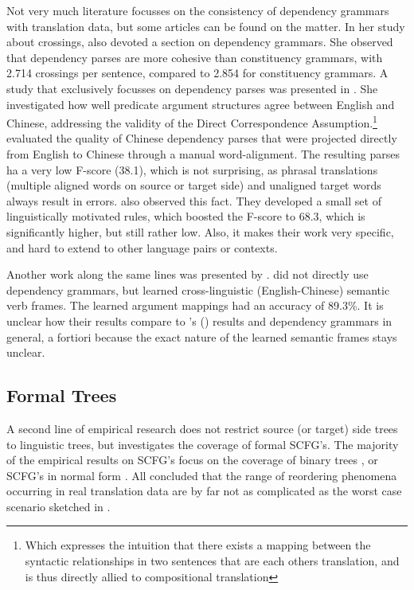 \documentclass{report}
\theoremstyle{break}
\def\citepos#1{\citeauthor{#1}'s (\citeyear{#1})}
\begin{document}
Not very much literature focusses on the consistency of dependency grammars with translation data, but some articles can be found on the matter. In her study about crossings, \citeauthor{fox2002phrasal} also devoted a section on dependency grammars. She observed that dependency parses are more cohesive than constituency grammars, with
2.714 crossings per sentence, compared to 2.854 for constituency grammars. A study that exclusively focusses on dependency parses was presented in \cite{hwa2002evaluating}. She investigated how well predicate argument structures agree between English and Chinese, addressing the validity of the Direct Correspondence Assumption.\footnote{Which expresses the intuition that there exists a mapping between the syntactic relationships in two sentences that are each others translation, and is thus directly allied to compositional translation} \citeauthor{hwa2002evaluating} evaluated the quality of Chinese dependency parses that were projected directly from English to Chinese through a manual word-alignment. The resulting parses ha a very low F-score (38.1), which is not surprising, as phrasal translations (multiple aligned words on source or target side) and unaligned target words always result in errors. \citeauthor{hwa2002evaluating} also observed this fact. They developed a small set of linguistically motivated rules, which boosted the F-score to 68.3, which is significantly higher, but still rather low. Also, it makes their work very specific, and hard to extend to other language pairs or contexts.

Another work along the same lines was presented by \cite{fung2006automatic}. \citeauthor{fung2006automatic} did not directly use dependency grammars, but learned cross-linguistic (English-Chinese) semantic verb frames. The learned argument mappings  had an accuracy of 89.3\%. It is unclear how their results compare to \citepos{hwa2002evaluating} results and dependency grammars in general, a fortiori because the exact nature of the learned semantic frames stays unclear.

\subsection{Formal Trees}

A second line of empirical research does not restrict source (or target) side trees to linguistic trees, but investigates the coverage of formal SCFG's. The majority of the empirical results on SCFG's focus on the coverage of binary trees \citep[e.g.,]{zhang2006synchronous,huang2009binarization}, or SCFG's in normal form \citep[e.g.,][]{sogaard2009empirical1,sogaard2009empirical2,sogaard2010can}. All concluded that the range of reordering phenomena occurring in real translation data are by far not as complicated as the worst case scenario sketched in \cite{satta2005some}.
\end{document}
